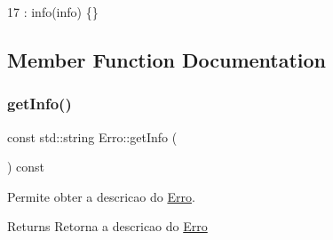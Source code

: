 \begin{DoxyCode}
17 : info(info) \{\}
\end{DoxyCode}


\subsection{Member Function Documentation}
\mbox{\label{classErro_abfc1e9735b259d88bb97828a23164eb0}} 
\subsubsection{\texorpdfstring{get\+Info()}{getInfo()}}
{\footnotesize\ttfamily const std\+::string Erro\+::get\+Info (\begin{DoxyParamCaption}{ }\end{DoxyParamCaption}) const\hspace{0.3cm}{\ttfamily [inline]}}



Permite obter a descricao do \hyperlink{classErro}{Erro}. 

\begin{DoxyReturn}{Returns}
Retorna a descricao do \hyperlink{classErro}{Erro} 
\end{DoxyReturn}

